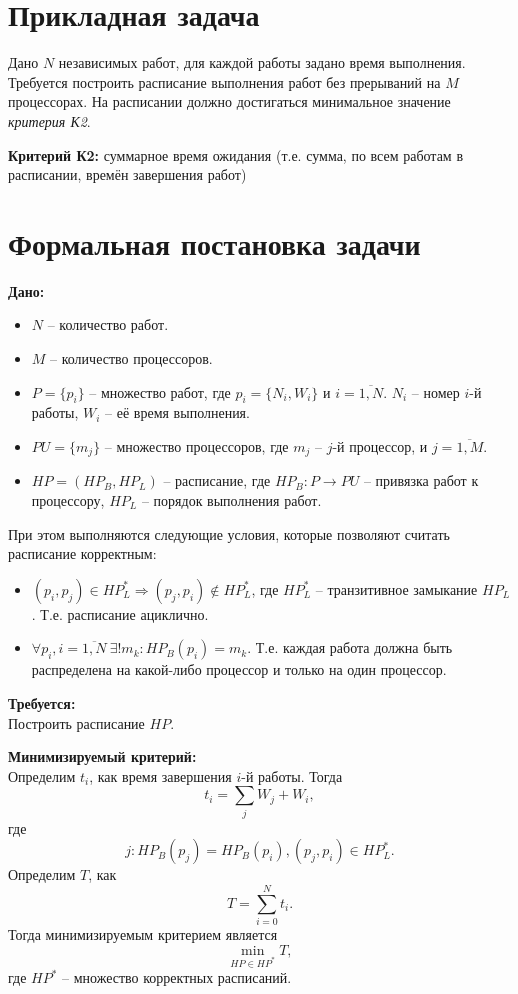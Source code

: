 \section*{Прикладная задача}
Дано $N$ независимых работ, для каждой работы задано время выполнения.
Требуется построить расписание выполнения работ без прерываний на $M$
процессорах. На расписании должно достигаться минимальное значение
\textit{критерия К2}.

\textbf{Критерий К2:} суммарное время ожидания (т.е. сумма, по всем работам в
расписании, времён завершения работ)
\section*{Формальная постановка задачи}
\textbf{Дано:}
    \begin{itemize}
        \item $N$ -- количество работ.
        \item $M$ -- количество процессоров.
        \item $P = \{p_i\}$ -- множество работ, где $p_i = \{N_i, W_i\}$ и
            $i = \overline{1, N}$. $N_i$ -- номер $i$-й работы, $W_i$ -- её
            время выполнения.
        \item $PU = \{m_j\}$ -- множество процессоров, где $m_j$ -- $j$-й
            процессор, и $j = \overline{1, M}$.
        \item $HP = (HP_B, HP_L)$ -- расписание, где $HP_B : P \to PU$ --
            привязка работ к процессору, $HP_L$ -- порядок выполнения работ.
    \end{itemize}
    При этом выполняются следующие условия, которые позволяют считать
    расписание корректным:
    \begin{itemize}
        \item $(p_i, p_j) \in HP^*_L \Rightarrow (p_j, p_i) \notin HP^*_L$, где
            $HP^*_L$ -- транзитивное замыкание $HP_L$.
            Т.е. расписание ациклично.
        \item $\forall p_i, i = \overline{1, N} \ \exists! m_k :
            HP_B(p_i) = m_k$. Т.е. каждая работа должна быть распределена на
            какой-либо процессор и только на один процессор.
    \end{itemize}

\textbf{Требуется:}\\
    Построить расписание $HP$.

\textbf{Минимизируемый критерий:}\\
    Определим $t_i$, как время завершения $i$-й работы. Тогда
    $$t_i = \sum\limits_{j} W_j + W_i,$$
    где
    $$j : HP_B(p_j) = HP_B(p_i), (p_j, p_i) \in HP^*_L.$$
    Определим $T$, как
    $$T = \sum\limits^{N}_{i = 0} t_i.$$
    Тогда минимизируемым критерием является
    $$\min\limits_{HP \in HP^*} T,$$
    где $HP^*$ -- множество корректных расписаний.


